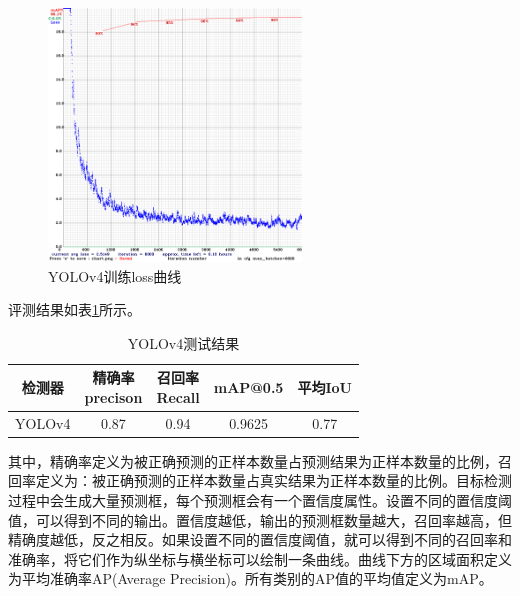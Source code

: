 \begin{figure}[htb] 
    \center
    \includegraphics[width=0.6\textwidth]{figure/fig23.png}
    \caption{YOLOv4训练loss曲线}
    \label{fig23}
\end{figure}

评测结果如表\ref{table8}所示。
\begin{table}[htb]
    \centering
    \caption{YOLOv4测试结果}
    \begin{tabular}{c c c c c}
    \toprule
    检测器 & \makecell{精确率\\precison} & \makecell{召回率\\Recall} & mAP@0.5 & 平均IoU \\
    \midrule 
    YOLOv4 & 0.87 & 0.94 & 0.9625 & 0.77 \\
    \bottomrule
    \end{tabular}
    \label{table8}
\end{table}
其中，精确率定义为被正确预测的正样本数量占预测结果为正样本数量的比例，召回率定义为：被正确预测的正样本数量占真实结果为正样本数量的比例。目标检测过程中会生成大量预测框，每个预测框会有一个置信度属性。设置不同的置信度阈值，可以得到不同的输出。置信度越低，输出的预测框数量越大，召回率越高，但精确度越低，反之相反。如果设置不同的置信度阈值，就可以得到不同的召回率和准确率，将它们作为纵坐标与横坐标可以绘制一条曲线。曲线下方的区域面积定义为平均准确率AP(Average Precision)。所有类别的AP值的平均值定义为mAP。

